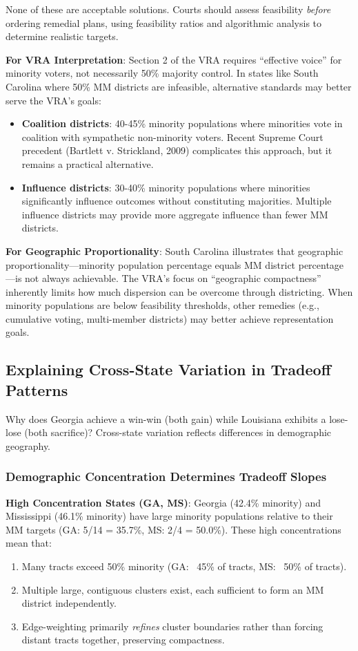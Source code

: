 None of these are acceptable solutions. Courts should assess feasibility \emph{before} ordering remedial plans, using feasibility ratios and algorithmic analysis to determine realistic targets.

\textbf{For VRA Interpretation}: Section 2 of the VRA requires ``effective voice'' for minority voters, not necessarily 50\% majority control. In states like South Carolina where 50\% MM districts are infeasible, alternative standards may better serve the VRA's goals:
\begin{itemize}
    \item \textbf{Coalition districts}: 40-45\% minority populations where minorities vote in coalition with sympathetic non-minority voters. Recent Supreme Court precedent (Bartlett v. Strickland, 2009) complicates this approach, but it remains a practical alternative.
    \item \textbf{Influence districts}: 30-40\% minority populations where minorities significantly influence outcomes without constituting majorities. Multiple influence districts may provide more aggregate influence than fewer MM districts.
\end{itemize}

\textbf{For Geographic Proportionality}: South Carolina illustrates that geographic proportionality---minority population percentage equals MM district percentage---is not always achievable. The VRA's focus on ``geographic compactness'' inherently limits how much dispersion can be overcome through districting. When minority populations are below feasibility thresholds, other remedies (e.g., cumulative voting, multi-member districts) may better achieve representation goals.

\subsection{Explaining Cross-State Variation in Tradeoff Patterns}

Why does Georgia achieve a win-win (both gain) while Louisiana exhibits a lose-lose (both sacrifice)? Cross-state variation reflects differences in demographic geography.

\subsubsection{Demographic Concentration Determines Tradeoff Slopes}

\textbf{High Concentration States (GA, MS)}: Georgia (42.4\% minority) and Mississippi (46.1\% minority) have large minority populations relative to their MM targets (GA: 5/14 = 35.7\%, MS: 2/4 = 50.0\%). These high concentrations mean that:
\begin{enumerate}
    \item Many tracts exceed 50\% minority (GA: ~45\% of tracts, MS: ~50\% of tracts).
    \item Multiple large, contiguous clusters exist, each sufficient to form an MM district independently.
    \item Edge-weighting primarily \emph{refines} cluster boundaries rather than forcing distant tracts together, preserving compactness.
\end{enumerate}

